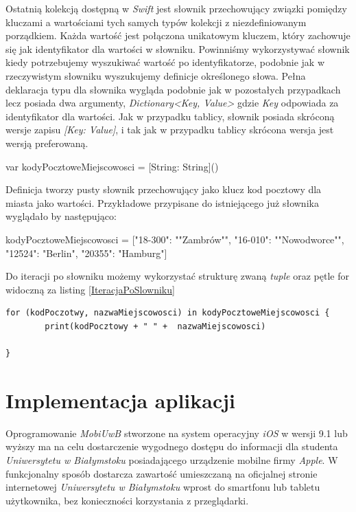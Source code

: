 \documentclass{iiuwb}
\begin{document}
Ostatnią kolekcją dostępną w \textit{Swift} jest słownik przechowujący związki pomiędzy kluczami a wartościami tych samych typów kolekcji z niezdefiniowanym porządkiem. Każda wartość jest połączona unikatowym kluczem, który zachowuje się jak identyfikator dla wartości w słowniku. Powinniśmy wykorzystywać słownik kiedy potrzebujemy wyszukiwać wartość po identyfikatorze, podobnie jak w rzeczywistym słowniku wyszukujemy definicje określonego słowa. Pełna deklaracja typu dla słownika wygląda podobnie jak w pozostałych przypadkach lecz posiada dwa argumenty, \textit{Dictionary<Key, Value>} gdzie \textit{Key} odpowiada za identyfikator dla wartości. Jak w przypadku tablicy, słownik posiada skróconą wersje zapisu \textit{[Key: Value]}, i tak jak w przypadku tablicy skrócona wersja jest wersją preferowaną.
\begin{center}
	var kodyPocztoweMiejscowosci = [String: String]()
\end{center}
Definicja tworzy pusty słownik przechowujący jako klucz kod pocztowy dla miasta jako wartości. Przykładowe przypisane do istniejącego już słownika wyglądało by następująco:  
\begin{center}
	kodyPocztoweMiejscowosci = ["18-300": ""Zambrów"", "16-010": ""Nowodworce"", "12524": "Berlin", "20355": "Hamburg"]
\end{center}
Do iteracji po słowniku możemy wykorzystać strukturę zwaną \textit{tuple} oraz pętle for widoczną za listing \ref{IteracjaPoSlowniku}
\begin{lstlisting}[label=IteracjaPoSlowniku, caption=Iteracja po słowniku z wykorzystaniem \textit{tuple} i pętli for.]
for (kodPoczotwy, nazwaMiejscowosci) in kodyPocztoweMiejscowosci {
		print(kodPocztowy + " " +  nazwaMiejscowosci)
		
}
\end{lstlisting}
\cleardoublepage
\chapter{Implementacja aplikacji}
\label{cha:Implementacja aplikacji}
Oprogramowanie \textit{MobiUwB} stworzone na system operacyjny \textit{iOS} w wersji 9.1 lub wyższy ma na celu dostarczenie wygodnego dostępu do informacji dla studenta \textit{Uniwersytetu w Białymstoku} posiadającego urządzenie mobilne firmy \textit{Apple}. W funkcjonalny sposób dostarcza zawartość umieszczaną na oficjalnej stronie internetowej \textit{Uniwersytetu w Białymstoku} wprost do smartfonu lub tabletu użytkownika, bez konieczności korzystania z przeglądarki. 
\end{document}

